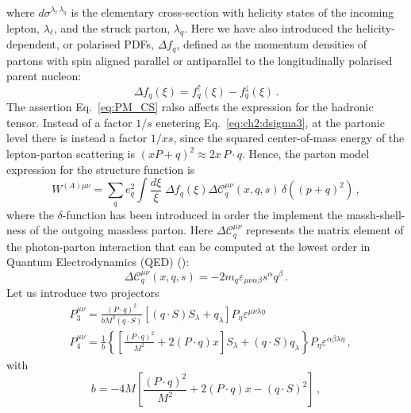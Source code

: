 where $d \sigma^{\lambda_{\ell} \, \lambda_{q}}$ is the elementary cross-section with helicity states of the incoming lepton, $\lambda_{\ell}$, and the struck parton, $\lambda_{q}$. Here we have also introduced the helicity-dependent, or polarised PDFs, $\Delta f_{q}$, defined as the momentum densities of partons with spin aligned parallel or antiparallel to the longitudinally polarised parent nucleon:
\begin{equation}
  \Delta f_{q} (\xi) = f_{q}^{\uparrow}(\xi) - f_{q}^{\downarrow}(\xi) \,.
\end{equation}
The assertion Eq.~\eqref{eq:PM_CS} ralso affects the expression for the hadronic tensor. Instead of a factor $1/s$ enetering Eq.~\eqref{eq:ch2:dsigma3}, at the partonic level there is instead a factor $1/xs$, since the squared center-of-mass energy of the lepton-parton scattering is $(xP + q)^2 \approx 2 x \, P \cdot q$. Hence, the parton model expression for the structure function is 
\begin{equation}
  W^{(A) \mu \nu}= \sum_{q} e_q^2\int \frac{d \xi}{\xi} \; \Delta f_{q} (\xi) \Delta \mathcal{C}^{\mu \nu}_{q} (x,q,s) \, \delta((p + q)^2) \,,
  \label{eq:had_tens_PM}
\end{equation}
where the $\delta$-function has been introduced in order the implement the massh-shell-ness of the outgoing massless parton. 
Here $\Delta \mathcal{C}^{\mu \nu}_{q}$ represents the matrix element of the photon-parton interaction that can be computed at the lowest order in Quantum Electrodynamics (QED) ():
\begin{equation}
  \Delta \mathcal{C}_q^{\mu \nu} (x,q,s) = - 2 m_q \varepsilon_{\mu \nu \alpha \beta} s^{\alpha} q^{\beta}\,.
\end{equation}
Let us introduce two projectors
\begin{align}
  & P_3^{\mu \nu} = \frac{(P \cdot q)^2}{b M^2 (q \cdot S)} \left[ (q \cdot S) S_{\lambda} + q_{\lambda}  \right] P_{\eta} \varepsilon^{\mu \nu \lambda \eta} 
  \\
  & P_4^{\mu \nu} = \frac{1}{b} \left\{ \left[ \frac{(P\cdot q)^2}{M^2} + 2 (P \cdot q) x \right]S_{\lambda} + (q \cdot S)q_{\lambda} \right\} P_{\eta} \varepsilon^{\alpha \beta \lambda \eta}\,,
\end{align}
with 
\begin{equation}
  b = -4M \left[ \frac{(P\cdot q)^2}{M^2}  + 2 (P \cdot q) x - (q \cdot S)^2\right]\,,
\end{equation}
